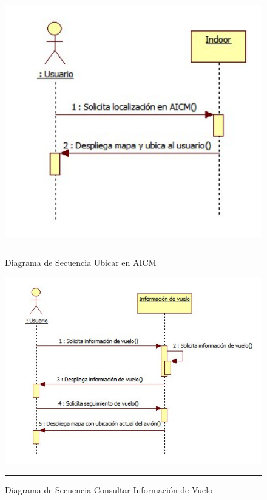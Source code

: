 \begin{figure}[h]
	\centering
		\includegraphics[width=1\textwidth]{Figuras/secUbicarAICM.png}
		\rule{30em}{0.5pt}
	\caption[Diagrama de Secuencia Ubicar en AICM]{Diagrama de Secuencia Ubicar en AICM}
	\label{fig:secUbicarAICM}
\end{figure}

\begin{figure}[h]
	\centering
		\includegraphics[width=1\textwidth]{Figuras/secConsultarInformacionVuelo.png}
		\rule{30em}{0.5pt}
	\caption[Diagrama de Secuencia Consultar Información de Vuelo]{Diagrama de Secuencia Consultar Información de Vuelo}
	\label{fig:secConsultarInformacionVuelo}
\end{figure}